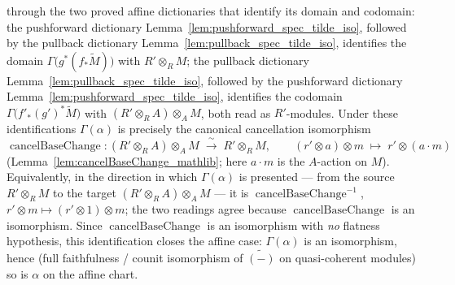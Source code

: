 \begin{lemma}
  through the two proved affine dictionaries that identify its domain and codomain: the
  pushforward dictionary Lemma~\ref{lem:pushforward_spec_tilde_iso}, followed by the
  pullback dictionary Lemma~\ref{lem:pullback_spec_tilde_iso}, identifies the domain
  \(\Gamma\bigl(g^*(f_*\widetilde{M})\bigr)\) with \(R' \otimes_R M\); the pullback
  dictionary Lemma~\ref{lem:pullback_spec_tilde_iso}, followed by the pushforward
  dictionary Lemma~\ref{lem:pushforward_spec_tilde_iso}, identifies the codomain
  \(\Gamma\bigl(f'_*(g')^*\widetilde{M}\bigr)\) with \((R' \otimes_R A) \otimes_A M\),
  both read as \(R'\)-modules. Under these identifications \(\Gamma(\alpha)\) is
  precisely the canonical cancellation isomorphism
  \[
    \operatorname{cancelBaseChange} :
    (R' \otimes_R A) \otimes_A M \;\xrightarrow{\ \sim\ }\; R' \otimes_R M,
    \qquad (r' \otimes a) \otimes m \;\mapsto\; r' \otimes (a \cdot m)
  \]
  (Lemma~\ref{lem:cancelBaseChange_mathlib}; here \(a \cdot m\) is the \(A\)-action on \(M\)). Equivalently, in the direction in which
  \(\Gamma(\alpha)\) is presented — from the source \(R' \otimes_R M\) to the target
  \((R' \otimes_R A) \otimes_A M\) — it is \(\operatorname{cancelBaseChange}^{-1}\),
  \(r' \otimes m \mapsto (r' \otimes 1) \otimes m\); the two readings agree because
  \(\operatorname{cancelBaseChange}\) is an isomorphism. Since
  \(\operatorname{cancelBaseChange}\) is an isomorphism with \emph{no} flatness
  hypothesis, this identification closes the affine case: \(\Gamma(\alpha)\) is an
  isomorphism, hence (full faithfulness / counit isomorphism of \(\widetilde{(-)}\) on
  quasi-coherent modules) so is \(\alpha\) on the affine chart.

\end{lemma}

